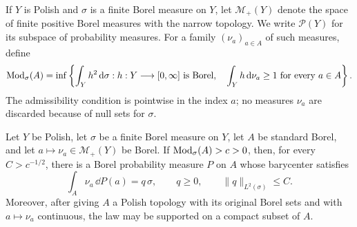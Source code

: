 If \(Y\) is Polish and \(\sigma\) is a finite Borel measure on \(Y\), let
\(\mathcal M_+(Y)\) denote the space of finite positive Borel measures with
the narrow topology.  We write $\mathcal P(Y)$ for its subspace of
probability measures.  For a family \((\nu_a)_{a\in A}\) of such measures,
define
\[
 \operatorname{Mod}_\sigma(A)=
 \inf\left\{\int_Y h^2\,\mathrm d\sigma:
  h:Y\longrightarrow[0,\infty]\text{ is Borel},\quad
  \int_Y h\,\mathrm d\nu_a\ge1\ \text{for every }a\in A\right\}.
\]
The admissibility condition is pointwise in the index \(a\); no measures
\(\nu_a\) are discarded because of null sets for \(\sigma\).

\begin{lemma}\label{lem:modulus-duality}
Let $Y$ be Polish, let $\sigma$ be a finite Borel measure on $Y$,
let \(A\) be standard Borel, and let
\(a\mapsto\nu_a\in\mathcal M_+(Y)\) be Borel.  If
\(\operatorname{Mod}_\sigma(A)>c>0\), then, for every \(C>c^{-1/2}\), there is a Borel
probability measure \(P\) on \(A\) whose barycenter satisfies
\[
 \int_A\nu_a\,\dd P(a)=q\,\sigma,
 \qquad q\ge0,
 \qquad \|q\|_{L^2(\sigma)}\le C.
\]
Moreover, after giving \(A\) a Polish topology with its original Borel sets
and with \(a\mapsto\nu_a\) continuous, the law may be supported on a compact
subset of \(A\).
\end{lemma}


